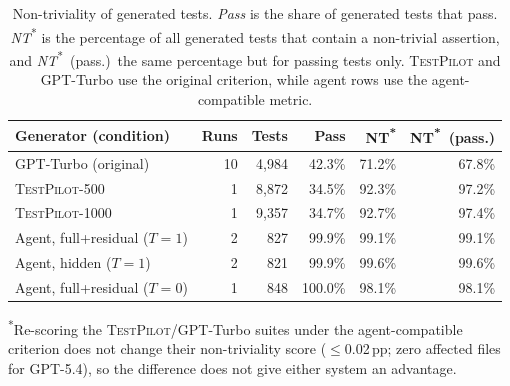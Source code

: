 \begin{table}[t]
\centering
\small
\setlength{\tabcolsep}{6pt}
\caption{Non-triviality of generated tests. \emph{Pass} is the share of
generated tests that pass. \emph{NT}\textsuperscript{*} is the percentage of
all generated tests that contain a non-trivial assertion, and
\emph{NT}\textsuperscript{*}~(pass.)\ the same percentage but for passing
tests only. \textsc{TestPilot} and GPT-Turbo use the original criterion,
while agent rows use the agent-compatible metric.}
\label{tab:nontriviality}
\begin{tabular}{@{}lrrrrr@{}}
\toprule
Generator (condition) & Runs & Tests & Pass & NT\textsuperscript{*} & NT\textsuperscript{*}~(pass.) \\
\midrule
GPT-Turbo (original) & 10 & 4{,}984 & 42.3\% & 71.2\% & 67.8\% \\
\textsc{TestPilot}-500 & 1 & 8{,}872 & 34.5\% & 92.3\% & 97.2\% \\
\textsc{TestPilot}-1000 & 1 & 9{,}357 & 34.7\% & 92.7\% & 97.4\% \\
\midrule
Agent, full+residual ($T{=}1$) & 2 & 827 & 99.9\% & 99.1\% & 99.1\% \\
Agent, hidden ($T{=}1$) & 2 & 821 & 99.9\% & 99.6\% & 99.6\% \\
Agent, full+residual ($T{=}0$) & 1 & 848 & 100.0\% & 98.1\% & 98.1\% \\
\bottomrule
\end{tabular}

\smallskip
{\footnotesize\raggedright \textsuperscript{*}Re-scoring the \textsc{TestPilot}/GPT-Turbo suites
under the agent-compatible criterion does not change their non-triviality score
($\le$0.02\,pp; zero affected files for GPT-5.4), so the difference does not give
either system an advantage.\par}
\end{table}
